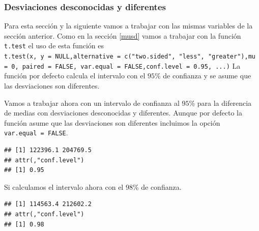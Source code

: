 \documentclass[]{book}
\newenvironment{Shaded}{\begin{snugshade}}{\end{snugshade}}
\newcommand{\DataTypeTok}[1]{\textcolor[rgb]{0.13,0.29,0.53}{#1}}
\newcommand{\FloatTok}[1]{\textcolor[rgb]{0.00,0.00,0.81}{#1}}
\newcommand{\KeywordTok}[1]{\textcolor[rgb]{0.13,0.29,0.53}{\textbf{#1}}}
\newcommand{\NormalTok}[1]{#1}
\newcommand{\OperatorTok}[1]{\textcolor[rgb]{0.81,0.36,0.00}{\textbf{#1}}}
\newcommand{\OtherTok}[1]{\textcolor[rgb]{0.56,0.35,0.01}{#1}}
\begin{document}
\hypertarget{desviaciones-desconocidas-y-diferentes-1}{%
\subsubsection{Desviaciones desconocidas y diferentes}\label{desviaciones-desconocidas-y-diferentes-1}}

Para esta sección y la siguiente vamos a trabajar con las mismas variables de la sección anterior. Como en la sección \ref{musd} vamos a trabajar con la función \texttt{t.test} el uso de esta función es \texttt{t.test(x,\ y\ =\ NULL,alternative\ =\ c("two.sided",\ "less",\ "greater"),mu\ =\ 0,\ paired\ =\ FALSE,\ var.equal\ =\ FALSE,conf.level\ =\ 0.95,\ ...)} La función por defecto calcula el intervalo con el \(95\)\% de confianza y se asume que las desviaciones son diferentes.

Vamos a trabajar ahora con un intervalo de confianza al \(95\)\% para la diferencia de medias con desviaciones desconocidas y diferentes. Aunque por defecto la función asume que las desviaciones son diferentes incluimos la opción \texttt{var.equal\ =\ FALSE}.

\begin{Shaded}
\end{Shaded}

\begin{verbatim}
## [1] 122396.1 204769.5
## attr(,"conf.level")
## [1] 0.95
\end{verbatim}

Si calculamos el intervalo ahora con el \(98\)\% de confianza.

\begin{Shaded}
\end{Shaded}

\begin{verbatim}
## [1] 114563.4 212602.2
## attr(,"conf.level")
## [1] 0.98
\end{verbatim}
\end{document}
